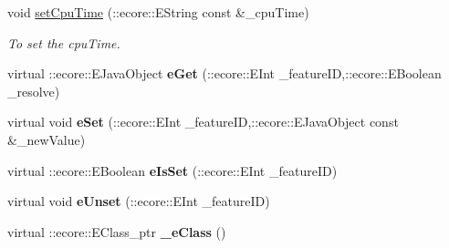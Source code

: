 \begin{DoxyCompactItemize}
void \hyperlink{classTMS__Data_1_1SubmitOptions_a0fae138b6318fbc3b486928a08690ada}{setCpuTime} (::ecore::EString const \&\_\-cpuTime)
\begin{DoxyCompactList}\small\item\em To set the cpuTime. \item\end{DoxyCompactList}\item 
\hypertarget{classTMS__Data_1_1SubmitOptions_ae36b522a63d4c5233cae5a9dd995b358}{
virtual ::ecore::EJavaObject {\bfseries eGet} (::ecore::EInt \_\-featureID,::ecore::EBoolean \_\-resolve)}
\label{classTMS__Data_1_1SubmitOptions_ae36b522a63d4c5233cae5a9dd995b358}

\item 
\hypertarget{classTMS__Data_1_1SubmitOptions_ad72e4e8b26d8e1cdcf1fa23672bcfa90}{
virtual void {\bfseries eSet} (::ecore::EInt \_\-featureID,::ecore::EJavaObject const \&\_\-newValue)}
\label{classTMS__Data_1_1SubmitOptions_ad72e4e8b26d8e1cdcf1fa23672bcfa90}

\item 
\hypertarget{classTMS__Data_1_1SubmitOptions_a6778e2a209c5ad01f93c7fcc49bacfe2}{
virtual ::ecore::EBoolean {\bfseries eIsSet} (::ecore::EInt \_\-featureID)}
\label{classTMS__Data_1_1SubmitOptions_a6778e2a209c5ad01f93c7fcc49bacfe2}

\item 
\hypertarget{classTMS__Data_1_1SubmitOptions_ad5a989fed944c4b15e80988f2c663f5a}{
virtual void {\bfseries eUnset} (::ecore::EInt \_\-featureID)}
\label{classTMS__Data_1_1SubmitOptions_ad5a989fed944c4b15e80988f2c663f5a}

\item 
\hypertarget{classTMS__Data_1_1SubmitOptions_a4021e345bd775a19137c351f3656a9ba}{
virtual ::ecore::EClass\_\-ptr {\bfseries \_\-eClass} ()}
\label{classTMS__Data_1_1SubmitOptions_a4021e345bd775a19137c351f3656a9ba}

\end{DoxyCompactItemize}
